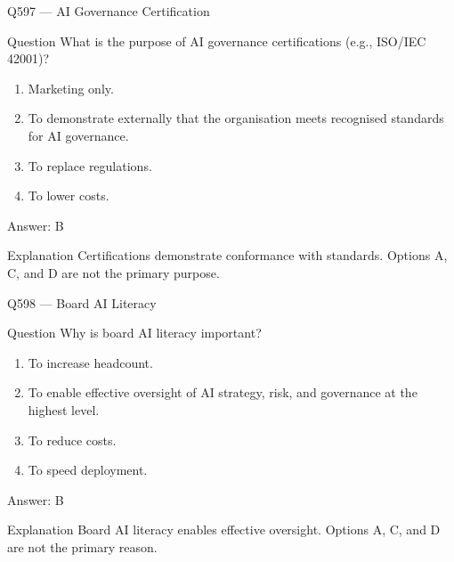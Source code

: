 \documentclass[aspectratio=169,8pt]{beamer}
\begin{document}
	\begin{frame}{Q597 --- AI Governance Certification}
		\begin{block}{Question}
			What is the purpose of AI governance certifications (e.g., ISO/IEC 42001)?
			\begin{enumerate}
				\item Marketing only.
				\item To demonstrate externally that the organisation meets recognised standards for AI governance.
				\item To replace regulations.
				\item To lower costs.
			\end{enumerate}
		\end{block}
		\begin{exampleblock}{Answer: B}\end{exampleblock}
		\begin{block}{Explanation}
			Certifications demonstrate conformance with standards. Options A, C, and D are not the primary purpose.
		\end{block}
	\end{frame}
	
	\begin{frame}{Q598 --- Board AI Literacy}
		\begin{block}{Question}
			Why is board AI literacy important?
			\begin{enumerate}
				\item To increase headcount.
				\item To enable effective oversight of AI strategy, risk, and governance at the highest level.
				\item To reduce costs.
				\item To speed deployment.
			\end{enumerate}
		\end{block}
		\begin{exampleblock}{Answer: B}\end{exampleblock}
		\begin{block}{Explanation}
			Board AI literacy enables effective oversight. Options A, C, and D are not the primary reason.
		\end{block}
	\end{frame}
	
\end{document}
